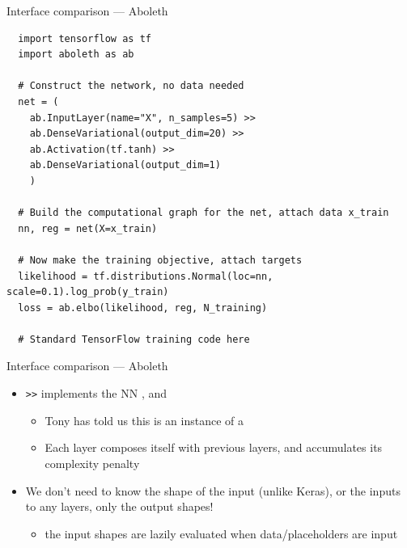 \documentclass[lualatex, aspectratio=169]{beamer}
\begin{document}
\begin{frame}[fragile]{Interface comparison --- Aboleth}

  \begin{verbatim}
  import tensorflow as tf
  import aboleth as ab

  # Construct the network, no data needed
  net = (
    ab.InputLayer(name="X", n_samples=5) >>
    ab.DenseVariational(output_dim=20) >>
    ab.Activation(tf.tanh) >>
    ab.DenseVariational(output_dim=1)
    )

  # Build the computational graph for the net, attach data x_train
  nn, reg = net(X=x_train)

  # Now make the training objective, attach targets
  likelihood = tf.distributions.Normal(loc=nn, scale=0.1).log_prob(y_train)
  loss = ab.elbo(likelihood, reg, N_training)

  # Standard TensorFlow training code here

  \end{verbatim}

\end{frame}


\begin{frame}{Interface comparison --- Aboleth}
  
  \begin{itemize}
    \item \texttt{>>} implements the NN , and 
    \begin{itemize}
      \item Tony has told us this is an instance of a 
      \item Each layer composes itself with previous layers, and accumulates its complexity penalty
    \end{itemize}
    \item We don't need to know the shape of the input (unlike Keras), or the inputs to any layers, only the output shapes!
    \begin{itemize}
      \item the input shapes are lazily evaluated when data/placeholders are input
    \end{itemize}
  \end{itemize}

\end{frame}
\end{document}
